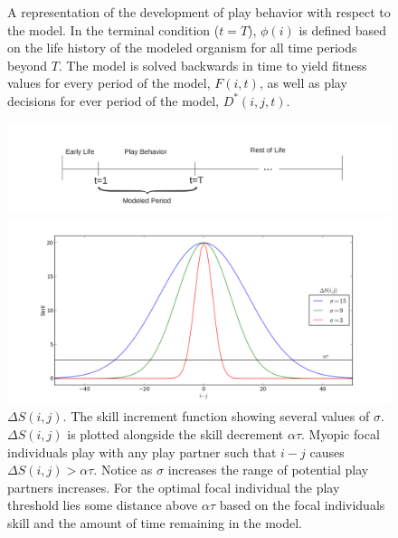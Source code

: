 \documentclass[12pt, letterpaper, fleqn]{article}
\begin{document}
	\clearpage
	\thispagestyle{empty}
	\begin{figure}[h!]
	\caption{A representation of the development of play behavior with respect to the model. In the terminal condition ($t=T$), $\phi(i)$ is defined based on the life history of the modeled organism for all time periods beyond $T$. The model is solved backwards in time to yield fitness values for every period of the model, $F(i,t)$, as well as play decisions for ever period of the model, $D^*(i,j,t)$.}
	\begin{center}
	\centerline{\includegraphics[width=170mm]{numberLineOfLife.pdf}}
	\end{center}
	\label{sdf}
	\caption{$\Delta S(i,j)$. The skill increment function showing several values of $\sigma$. $\Delta S(i,j)$ is plotted alongside the skill decrement $\alpha \tau$. Myopic focal individuals play with any play partner such that $i-j$ causes $\Delta S(i,j)>\alpha \tau$. Notice as $\sigma$ increases the range of potential play partners increases. For the optimal focal individual the play threshold lies some distance above $\alpha \tau$ based on the focal individuals skill and the amount of time remaining in the model.      }
	\begin{center}
	\centerline{\includegraphics[width=160mm]{sdf.pdf}}
	\end{center}
	\label{sdf}
	\end{figure}
	
\end{document}
